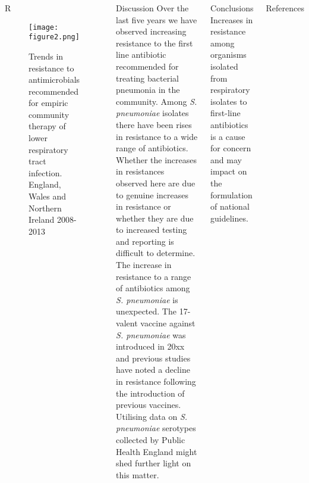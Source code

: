 \documentclass[final]{beamer}
\begin{document}
\begin{frame}
\begin{columns}[t]
  \begin{block}{\textcolor{comp_blue}{R}}
  \begin{figure}
  \texttt{[image: figure2.png]}
  \caption{Trends in resistance to antimicrobials recommended for empiric community therapy of lower respiratory tract infection. England, Wales and Northern Ireland 2008-2013}
  \end{figure}
  \label{fig2}  
  \end{block}

  \begin{block}{Discussion}
  Over the last five years we have observed increasing resistance to the first line antibiotic recommended for treating bacterial pneumonia in the community.
  Among \textit{S. pneumoniae} isolates there have been rises in resistance to a wide range of antibiotics. 
  Whether the increases in resistances observed here are due to genuine increases in resistance or whether they are due to increased testing and reporting is difficult to determine. 
  The increase in resistance to a range of antibiotics among \textit{S. pneumoniae} is unexpected. 
  The 17-valent vaccine against \textit{S. pneumoniae} was introduced in 20xx and previous studies have noted a decline in resistance following the introduction of previous vaccines. %
  Utilising data on \textit{S. pneumoniae} serotypes collected by Public Health England might shed further light on this matter. 
  \end{block}
  
  \begin{block}{Conclusions}
  Increases in resistance among organisms isolated from respiratory isolates to first-line antibiotics is a cause for concern and may impact on the formulation of national guidelines.  
  
   
  \end{block}
  
  \begin{block}{References}
   

  \end{block}
 \end{columns}

\end{frame}
\end{document}
